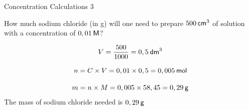       \begin{wex}{Concentration Calculations 3 }\label{m38712*probfhsst!!!underscore!!!id1796}
{
\label{m38712*id283476}How much sodium chloride (in g) will one need to prepare $500\phantom{\rule{2pt}{0ex}}{\mathsf{cm}}^{3}$ of solution with a concentration of $0,01\phantom{\rule{2pt}{0ex}}\mathsf{M}$?\par 
      \vspace{5pt} }
{
    \begin{equation}
    V=\frac{500}{1 000}=0,5\phantom{\rule{2pt}{0ex}}{\mathsf{dm}}^{3}
      \end{equation}
      \label{m38712*id283565}\nopagebreak\noindent{}
        
    \begin{equation}
    n=C\ensuremath{\times}V=0,01\ensuremath{\times}0,5=0,005\phantom{\rule{2pt}{0ex}}\mathsf{mol}
      \end{equation}
      \label{m38712*id283636}\nopagebreak\noindent{}
        
    \begin{equation}
    m=n\ensuremath{\times}M=0,005\ensuremath{\times}58,45=0,29\phantom{\rule{2pt}{0ex}}\mathsf{g}
      \end{equation}
      \label{m38712*id283684}The mass of sodium chloride needed is $0,29\phantom{\rule{2pt}{0ex}}\mathsf{g}$
 \par 
}
    \end{wex}
    \noindent
\label{m38712*secfhsst!!!underscore!!!id1879}
